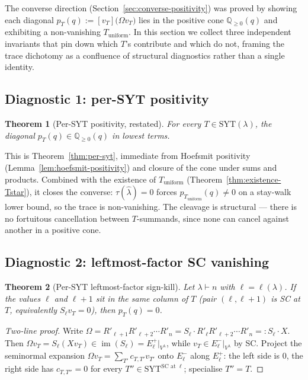 \documentclass[11pt]{article}
\newtheorem{theorem}{Theorem}[section]
\theoremstyle{definition}
\newcommand{\Vlam}{V^{\lambda}}
\newcommand{\Om}{\Omega}
\newcommand{\bla}{\widehat\lambda}
\newcommand{\Rp}{{R'}}
\newcommand{\SYT}{\mathrm{SYT}}
\newcommand{\Eplus}{E^{+}}
\newcommand{\Eminus}{E^{-}}
\newcommand{\Tunif}{T_{\mathrm{uniform}}}
\DeclareMathOperator{\im}{im}
\begin{document}
The converse direction (Section~\ref{sec:converse-positivity}) was proved
by showing each diagonal $p_T(q) := [v_T]\bigl(\Om v_T\bigr)$ lies in the
positive cone $\mathbb{Q}_{\ge 0}(q)$ and exhibiting a non-vanishing
$\Tunif$.  In this section we collect three independent invariants that
pin down which $T$'s contribute and which do not, framing the trace
dichotomy as a confluence of structural diagnostics rather than a single
identity.

\subsection{Diagnostic 1: per-SYT positivity}\label{sec:diag1}

\begin{theorem}[Per-SYT positivity, restated]\label{thm:per-syt-restate}
For every $T \in \SYT(\lambda)$, the diagonal $p_T(q) \in \mathbb{Q}_{\ge 0}(q)$
in lowest terms.
\end{theorem}

This is Theorem~\ref{thm:per-syt}, immediate from Hoefsmit positivity
(Lemma~\ref{lem:hoefsmit-positivity}) and closure of the cone under sums
and products.  Combined with the existence of $\Tunif$
(Theorem~\ref{thm:existence-Tstar}), it closes the converse: $\tau(\bla) = 0$
forces $p_{\Tunif}(q) \ne 0$ on a stay-walk lower bound, so the trace is
non-vanishing.  The cleavage is structural — there is no fortuitous
cancellation between $T$-summands, since none can cancel against another
in a positive cone.

\subsection{Diagnostic 2: leftmost-factor SC vanishing}\label{sec:diag2}

\begin{theorem}[Per-SYT leftmost-factor sign-kill]\label{thm:per-syt-leftmost}
Let $\lambda \vdash n$ with $\ell = \ell(\lambda)$.  If the values $\ell$
and $\ell + 1$ sit in the same column of $T$ (pair $(\ell, \ell+1)$ is SC
at $T$, equivalently $S_\ell v_T = 0$), then $p_T(q) = 0$.
\end{theorem}

\begin{proof}[Two-line proof]
Write $\Om = \Rp_{\ell+1}\Rp_{\ell+2}\cdots \Rp_n = S_\ell \cdot \Rp_\ell \Rp_{\ell+2}\cdots\Rp_n =: S_\ell \cdot X$.
Then $\Om v_T = S_\ell(X v_T) \in \im(S_\ell) = \Eplus_\ell|_{\Vlam}$, while
$v_T \in \Eminus_\ell|_{\Vlam}$ by SC.  Project the seminormal expansion
$\Om v_T = \sum_{T'} c_{T,T'} v_{T'}$ onto $\Eminus_\ell$ along $\Eplus_\ell$:
the left side is $0$, the right side has $c_{T,T''} = 0$ for every
$T'' \in \SYT^{\mathrm{SC}\text{ at }\ell}$; specialise $T'' = T$.
\end{proof}
\end{document}
